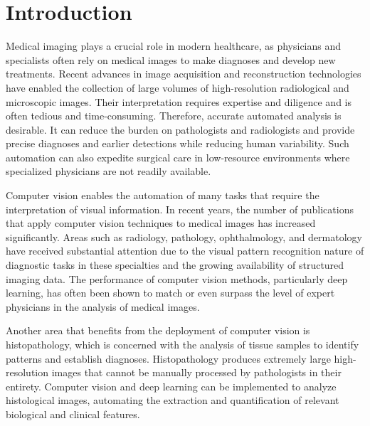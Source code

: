 \chapter{Introduction}
\setcounter{page}{1}
Medical imaging plays a crucial role in modern healthcare, as physicians and specialists often rely on medical images to make diagnoses and develop new treatments. Recent advances in image acquisition and reconstruction technologies have enabled the collection of large volumes of high-resolution radiological and microscopic images. Their interpretation requires expertise and diligence and is often tedious and time-consuming. Therefore, accurate automated analysis is desirable. It can reduce the burden on pathologists and radiologists and provide precise diagnoses and earlier detections while reducing human variability. Such automation can also expedite surgical care in low-resource environments where specialized physicians are not readily available.~\cite{Aljuaid2022, Lindroth2024}

Computer vision enables the automation of many tasks that require the interpretation of visual information. In recent years, the number of publications that apply computer vision techniques to medical images has increased significantly. Areas such as radiology, pathology, ophthalmology, and dermatology have received substantial attention due to the visual pattern recognition nature of diagnostic tasks in these specialties and the growing availability of structured imaging data. The performance of computer vision methods, particularly deep learning, has often been shown to match or even surpass the level of expert physicians in the analysis of medical images.~\cite{Esteva2021}

Another area that benefits from the deployment of computer vision is histopathology, which is concerned with the analysis of tissue samples to identify patterns and establish diagnoses. Histopathology produces extremely large high-resolution images that cannot be manually processed by pathologists in their entirety. Computer vision and deep learning can be implemented to analyze histological images, automating the extraction and quantification of relevant biological and clinical features.~\cite{Moscalu2023}

